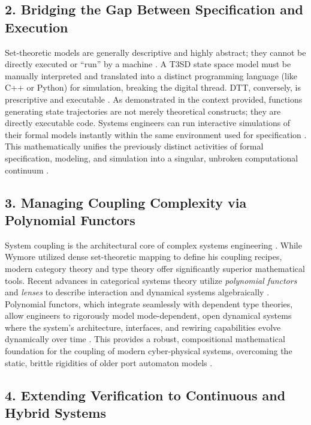 \documentclass[11pt]{article}
\begin{document}
\subsection{2. Bridging the Gap Between Specification and Execution}
Set-theoretic models are generally descriptive and highly abstract; they cannot be directly executed or ``run'' by a machine \parencite{Ref15}. A T3SD state space model must be manually interpreted and translated into a distinct programming language (like C++ or Python) for simulation, breaking the digital thread. DTT, conversely, is prescriptive and executable \parencite{Ref19}. As demonstrated in the context provided, functions generating state trajectories are not merely theoretical constructs; they are directly executable code. Systems engineers can run interactive simulations of their formal models instantly within the same environment used for specification \parencite{Ref19}. This mathematically unifies the previously distinct activities of formal specification, modeling, and simulation into a singular, unbroken computational continuum \parencite{Ref22, Ref44}.\subsection{3. Managing Coupling Complexity via Polynomial Functors}
System coupling is the architectural core of complex systems engineering \parencite{Ref14, Ref36}. While Wymore utilized dense set-theoretic mapping to define his coupling recipes, modern category theory and type theory offer significantly superior mathematical tools. Recent advances in categorical systems theory utilize \textit{polynomial functors} and \textit{lenses} to describe interaction and dynamical systems algebraically \parencite{Ref45, Ref46, Ref47}. Polynomial functors, which integrate seamlessly with dependent type theories, allow engineers to rigorously model mode-dependent, open dynamical systems where the system's architecture, interfaces, and rewiring capabilities evolve dynamically over time \parencite{Ref46, Ref47}. This provides a robust, compositional mathematical foundation for the coupling of modern cyber-physical systems, overcoming the static, brittle rigidities of older port automaton models \parencite{Ref45, Ref48, Ref49}.\subsection{4. Extending Verification to Continuous and Hybrid Systems}
\end{document}
